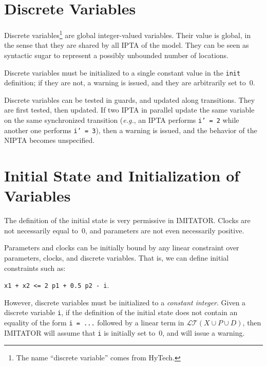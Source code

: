 \documentclass[a4paper,11pt]{report}
\newcommand{\Clock}{X} %
\newcommand{\DVar}{D} %
\newcommand{\LTerm}{\mathcal{LT}} %
\newcommand{\LTermXPD}{\LTerm(\Clock \cup \Param \cup \DVar)}
\newcommand{\Param}{P} %
\newcommand{\hytech}{{\sc HyTech}}
\newcommand{\imitator}{\textsf{IMITATOR}}
\newcommand{\IPTA}{IPTA}
\newcommand{\NIPTA}{NIPTA}
\newcommand{\styleIMI}[1]{\textcolor{imicolor}{\texttt{#1}}}
\newcommand{\eg}{\textcolor{colorok}{\textit{e.g.}, }}
\begin{document}




\section{Discrete Variables}

Discrete variables\footnote{%
	The name ``discrete variable'' comes from \hytech{}.
}
are global integer-valued variables.
Their value is global, in the sense that they are shared by all \IPTA{} of the model.
They can be seen as syntactic sugar to represent a possibly unbounded number of locations.

Discrete variables must be initialized to a single constant value in the \styleIMI{init} definition;
if they are not, a warning is issued, and they are arbitrarily set to~0.

Discrete variables can be tested in guards, and updated along transitions.
They are first tested, then updated.
If two \IPTA{} in parallel update the same variable on the same synchronized transition (\eg{} an \IPTA{} performs \styleIMI{i' = 2} while another one performs \styleIMI{i' = 3}), then a warning is issued, and the behavior of the \NIPTA{} becomes unspecified.



\section{Initial State and Initialization of Variables}\label{ss:init}

The definition of the initial state is very permissive in \imitator{}.
Clocks are not necessarily equal to~0, and parameters are not even necessarily positive.

Parameters and clocks can be initially bound by any linear constraint over parameters, clocks, and discrete variables.
That is, we can define initial constraints such as:
\begin{center}
	\styleIMI{x1 + x2 <= 2 p1 + 0.5 p2 - i}.
\end{center}

However, discrete variables must be initialized to a \emph{constant integer}.
Given a discrete variable \styleIMI{i}, if the definition of the initial state does not contain an equality of the form \styleIMI{i = ...} followed by a linear term in $\LTermXPD$, then \imitator{} will assume that \styleIMI{i} is initially set to~0, and will issue a warning.
\end{document}
